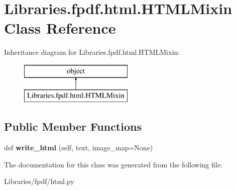 \hypertarget{class_libraries_1_1fpdf_1_1html_1_1_h_t_m_l_mixin}{}\section{Libraries.\+fpdf.\+html.\+H\+T\+M\+L\+Mixin Class Reference}
\label{class_libraries_1_1fpdf_1_1html_1_1_h_t_m_l_mixin}
Inheritance diagram for Libraries.\+fpdf.\+html.\+H\+T\+M\+L\+Mixin\+:\begin{figure}[H]
\begin{center}
\leavevmode
\includegraphics[height=2.000000cm]{class_libraries_1_1fpdf_1_1html_1_1_h_t_m_l_mixin}
\end{center}
\end{figure}
\subsection*{Public Member Functions}
\begin{DoxyCompactItemize}
\item 
def {\bfseries write\+\_\+html} (self, text, image\+\_\+map=None)\hypertarget{class_libraries_1_1fpdf_1_1html_1_1_h_t_m_l_mixin_ac4d0b4fec83340abaebbfac21231732e}{}\label{class_libraries_1_1fpdf_1_1html_1_1_h_t_m_l_mixin_ac4d0b4fec83340abaebbfac21231732e}

\end{DoxyCompactItemize}


The documentation for this class was generated from the following file\+:\begin{DoxyCompactItemize}
\item 
Libraries/fpdf/html.\+py\end{DoxyCompactItemize}
